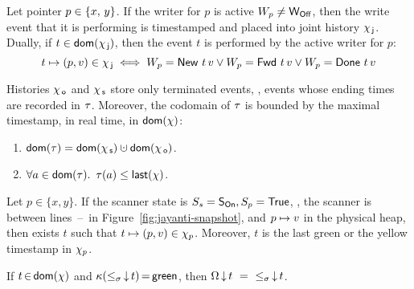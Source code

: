 
\begin{invariant}\label{inv:joint-hist}%
Let pointer $p \in \{x,\, y\}$. If the writer for $p$ is active \ie
$W_p \neq \mathsf{W_{Off}}$, then the write event that it is performing is
timestamped and placed into joint history $\chi_{\, \mathsf{j}}$. Dually, if $t \in
\mathsf{dom}(\chi_{\, \mathsf{j}})$, then the event $t$ is performed by the active writer
for $p$:
$$t \mapsto (p,v) \in \chi_{\, \mathsf{j}} \iff W_p = \mathsf{New}\ t\, v \vee
W_p = \mathsf{Fwd}\ t\, v \vee W_p = \mathsf{Done}\ t\, v $$
\end{invariant}


\begin{invariant}\label{inv:dom-tau}%
Histories $\chi_{\, \mathsf{o}}$ and $\chi_{\, \mathsf{s}}$ store only terminated events, \ie,
events whose ending times are recorded in $\tau$. Moreover, the codomain
of $\tau$ is bounded by the maximal timestamp, in real time, in
$\mathsf{dom}(\chi)$:
\begin{enumerate}
\item $\dom{\E} = \dom{\histS} \hunion \dom{\histO}$.
\item $\forall a \in \mathsf{dom}(\tau)\mathord{.}\,\ \tau(a) \leq
  \mathsf{last}(\chi)$.
\end{enumerate}
\end{invariant}


\begin{lemma}\label{lemma:first-read}%
Let $p \in \{x, y\}$. If the scanner state is $S_s= \mathsf{S_{On}}, S_p =
\mathsf{True}$, \ie, the scanner is between
lines~\lineScanReadsX--\lineScanReadsY\ in
Figure~\ref{fig:jayanti-snapshot}, and $ p \mapsto v$ in the physical
heap, then exists $t$ such that $ t \mapsto (p, v) \in
\chi_p$. Moreover, $t$
is the last green or the yellow timestamp in $\chi_p$.
\end{lemma}

\begin{lemma}[Chain]\label{lemma:complete-green}%
If $t\,{\in}\,\mathsf{dom}(\chi)$ and $\kappa({\mathrel{\leq_\sigma}}\,{\downarrow}\,t)\,{=}\,\mathsf{green}$, 
then
$\ideal{\stableorder}{t}\ =\ \ideal{{\tleq}}{t}$.
\end{lemma}


